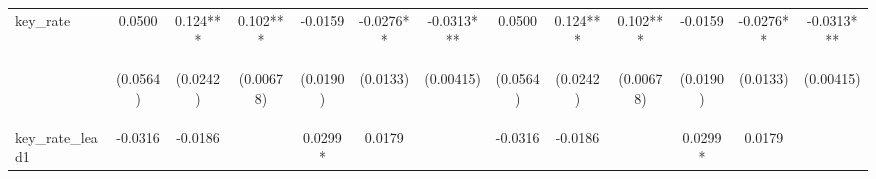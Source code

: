 \documentclass[]{article}
\begin{document}
\begin{center}
\begin{tabular}{lcccccccccccc}
key\_rate & 0.0500 & 0.124*** & 0.102*** & -0.0159 & -0.0276** & -0.0313*** & 0.0500 & 0.124*** & 0.102*** & -0.0159 & -0.0276** & -0.0313*** \\
\vspace{4pt} & \begin{footnotesize}(0.0564)\end{footnotesize} & \begin{footnotesize}(0.0242)\end{footnotesize} & \begin{footnotesize}(0.00678)\end{footnotesize} & \begin{footnotesize}(0.0190)\end{footnotesize} & \begin{footnotesize}(0.0133)\end{footnotesize} & \begin{footnotesize}(0.00415)\end{footnotesize} & \begin{footnotesize}(0.0564)\end{footnotesize} & \begin{footnotesize}(0.0242)\end{footnotesize} & \begin{footnotesize}(0.00678)\end{footnotesize} & \begin{footnotesize}(0.0190)\end{footnotesize} & \begin{footnotesize}(0.0133)\end{footnotesize} & \begin{footnotesize}(0.00415)\end{footnotesize} \\
key\_rate\_lead1 & -0.0316 & -0.0186 &  & 0.0299* & 0.0179 &  & -0.0316 & -0.0186 &  & 0.0299* & 0.0179 &  \\

\end{tabular}
\end{center}
\end{document}
